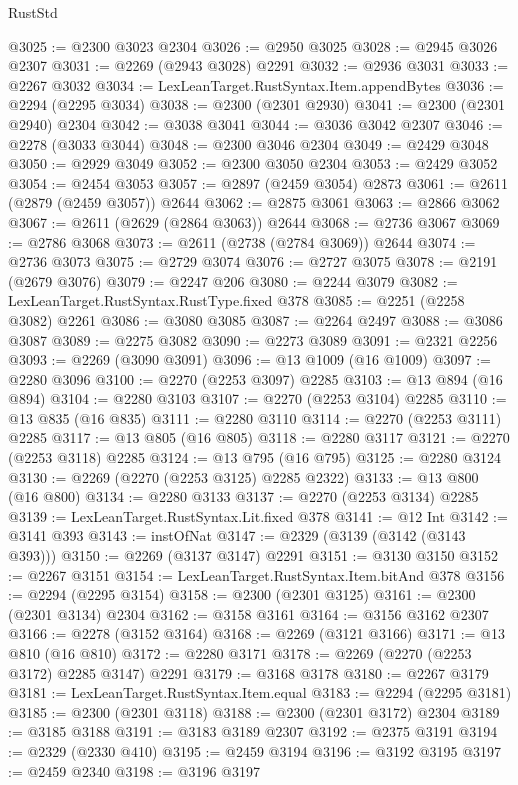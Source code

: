 \begin{lexlean}{RustStd}
\begin{coremodule}
@3025 := @2300 @3023 @2304
@3026 := @2950 @3025
@3028 := @2945 @3026 @2307
@3031 := @2269 (@2943 @3028) @2291
@3032 := @2936 @3031
@3033 := @2267 @3032
@3034 := LexLeanTarget.RustSyntax.Item.appendBytes
@3036 := @2294 (@2295 @3034)
@3038 := @2300 (@2301 @2930)
@3041 := @2300 (@2301 @2940) @2304
@3042 := @3038 @3041
@3044 := @3036 @3042 @2307
@3046 := @2278 (@3033 @3044)
@3048 := @2300 @3046 @2304
@3049 := @2429 @3048
@3050 := @2929 @3049
@3052 := @2300 @3050 @2304
@3053 := @2429 @3052
@3054 := @2454 @3053
@3057 := @2897 (@2459 @3054) @2873
@3061 := @2611 (@2879 (@2459 @3057)) @2644
@3062 := @2875 @3061
@3063 := @2866 @3062
@3067 := @2611 (@2629 (@2864 @3063)) @2644
@3068 := @2736 @3067
@3069 := @2786 @3068
@3073 := @2611 (@2738 (@2784 @3069)) @2644
@3074 := @2736 @3073
@3075 := @2729 @3074
@3076 := @2727 @3075
@3078 := @2191 (@2679 @3076)
@3079 := @2247 @206
@3080 := @2244 @3079
@3082 := LexLeanTarget.RustSyntax.RustType.fixed @378
@3085 := @2251 (@2258 @3082) @2261
@3086 := @3080 @3085
@3087 := @2264 @2497
@3088 := @3086 @3087
@3089 := @2275 @3082
@3090 := @2273 @3089
@3091 := @2321 @2256
@3093 := @2269 (@3090 @3091)
@3096 := @13 @1009 (@16 @1009)
@3097 := @2280 @3096
@3100 := @2270 (@2253 @3097) @2285
@3103 := @13 @894 (@16 @894)
@3104 := @2280 @3103
@3107 := @2270 (@2253 @3104) @2285
@3110 := @13 @835 (@16 @835)
@3111 := @2280 @3110
@3114 := @2270 (@2253 @3111) @2285
@3117 := @13 @805 (@16 @805)
@3118 := @2280 @3117
@3121 := @2270 (@2253 @3118) @2285
@3124 := @13 @795 (@16 @795)
@3125 := @2280 @3124
@3130 := @2269 (@2270 (@2253 @3125) @2285 @2322)
@3133 := @13 @800 (@16 @800)
@3134 := @2280 @3133
@3137 := @2270 (@2253 @3134) @2285
@3139 := LexLeanTarget.RustSyntax.Lit.fixed @378
@3141 := @12 Int
@3142 := @3141 @393
@3143 := instOfNat
@3147 := @2329 (@3139 (@3142 (@3143 @393)))
@3150 := @2269 (@3137 @3147) @2291
@3151 := @3130 @3150
@3152 := @2267 @3151
@3154 := LexLeanTarget.RustSyntax.Item.bitAnd @378
@3156 := @2294 (@2295 @3154)
@3158 := @2300 (@2301 @3125)
@3161 := @2300 (@2301 @3134) @2304
@3162 := @3158 @3161
@3164 := @3156 @3162 @2307
@3166 := @2278 (@3152 @3164)
@3168 := @2269 (@3121 @3166)
@3171 := @13 @810 (@16 @810)
@3172 := @2280 @3171
@3178 := @2269 (@2270 (@2253 @3172) @2285 @3147) @2291
@3179 := @3168 @3178
@3180 := @2267 @3179
@3181 := LexLeanTarget.RustSyntax.Item.equal
@3183 := @2294 (@2295 @3181)
@3185 := @2300 (@2301 @3118)
@3188 := @2300 (@2301 @3172) @2304
@3189 := @3185 @3188
@3191 := @3183 @3189 @2307
@3192 := @2375 @3191
@3194 := @2329 (@2330 @410)
@3195 := @2459 @3194
@3196 := @3192 @3195
@3197 := @2459 @2340
@3198 := @3196 @3197

\end{coremodule}
\end{lexlean}
